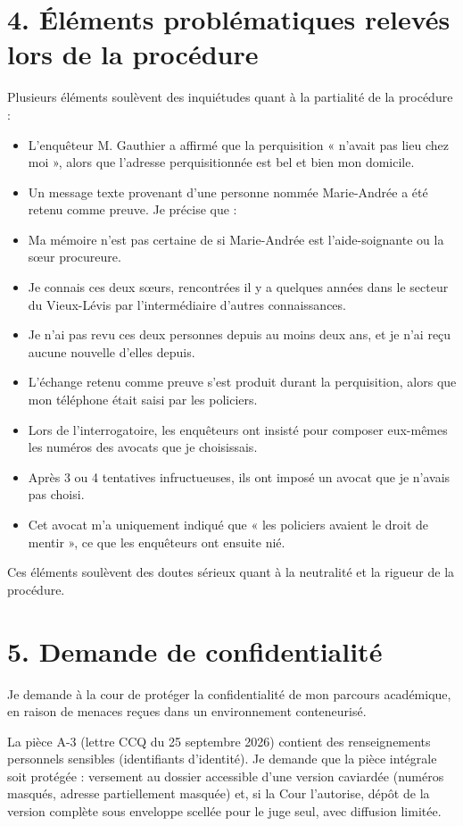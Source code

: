 \documentclass[12pt,a4paper]{article}
\begin{document}
\section*{4. Éléments problématiques relevés lors de la procédure}
Plusieurs éléments soulèvent des inquiétudes quant à la partialité de la procédure :

\begin{itemize}
  \item L’enquêteur M. Gauthier a affirmé que la perquisition « n’avait pas lieu chez moi », alors que l’adresse perquisitionnée est bel et bien mon domicile.
  \item Un message texte provenant d’une personne nommée Marie-Andrée a été retenu comme preuve. Je précise que :
  \item Ma mémoire n’est pas certaine de si Marie-Andrée est l’aide-soignante ou la sœur procureure.
  \item Je connais ces deux sœurs, rencontrées il y a quelques années dans le secteur du Vieux-Lévis par l’intermédiaire d’autres connaissances.
  \item Je n’ai pas revu ces deux personnes depuis au moins deux ans, et je n’ai reçu aucune nouvelle d’elles depuis.
  \item L’échange retenu comme preuve s’est produit durant la perquisition, alors que mon téléphone était saisi par les policiers.
  \item Lors de l’interrogatoire, les enquêteurs ont insisté pour composer eux-mêmes les numéros des avocats que je choisissais.
  \item Après 3 ou 4 tentatives infructueuses, ils ont imposé un avocat que je n’avais pas choisi.
  \item Cet avocat m’a uniquement indiqué que « les policiers avaient le droit de mentir », ce que les enquêteurs ont ensuite nié.
\end{itemize}

Ces éléments soulèvent des doutes sérieux quant à la neutralité et la rigueur de la procédure.

\section*{5. Demande de confidentialité}
Je demande à la cour de protéger la confidentialité de mon parcours académique, en raison de menaces reçues dans un environnement conteneurisé.

La pièce A-3 (lettre CCQ du 25 septembre 2026) contient des renseignements personnels sensibles (identifiants d’identité). Je demande que la pièce intégrale soit protégée : versement au dossier accessible d’une version caviardée (numéros masqués, adresse partiellement masquée) et, si la Cour l’autorise, dépôt de la version complète sous enveloppe scellée pour le juge seul, avec diffusion limitée.
\end{document}
